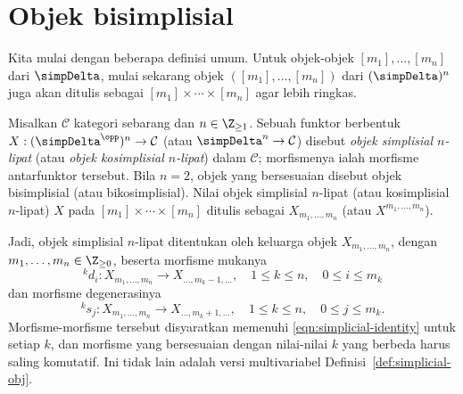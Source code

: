 
\section{Objek bisimplisial}\label{sec:bisimplicial}
\hypertarget{o014.aljabr2.chapter8.bisimplicial-a}{ }
Kita mulai dengan beberapa definisi umum. Untuk objek-objek
$[m_1],\ldots,[m_n]$ dari $\simpDelta$, mulai sekarang objek
$([m_1],\ldots,[m_n])$ dari $(\simpDelta)^n$ juga akan ditulis sebagai
$[m_1]\times\cdots\times[m_n]$ agar lebih ringkas.

\begin{definition}
	Misalkan $\mathcal{C}$ kategori sebarang dan $n\in\Z_{\geq1}$. Sebuah
	funktor berbentuk $X:(\simpDelta^{\opp})^n\to\mathcal{C}$ (atau
	$\simpDelta^n\to\mathcal{C}$) disebut \emph{objek simplisial $n$-lipat}
	(atau \emph{objek kosimplisial $n$-lipat}) dalam $\mathcal{C}$;
	morfismenya ialah morfisme antarfunktor tersebut. Bila $n=2$,
	objek yang bersesuaian disebut objek bisimplisial (atau bikosimplisial).
	Nilai objek simplisial $n$-lipat (atau kosimplisial $n$-lipat) $X$ pada
	$[m_1]\times\cdots\times[m_n]$ ditulis sebagai
	$X_{m_1,\ldots,m_n}$ (atau $X^{m_1,\ldots,m_n}$).
\end{definition}

Jadi, objek simplisial $n$-lipat ditentukan oleh keluarga objek
$X_{m_1,\ldots,m_n}$, dengan
$m_1,\ldots,m_n\in\Z_{\geq0}$, beserta morfisme mukanya
\[ {}^k d_i: X_{m_1, \ldots, m_n} \to X_{\ldots, m_k - 1, \ldots}, \quad 1 \leq k \leq n, \quad 0 \leq i \leq m_k \]
dan morfisme degenerasinya
\[ {}^k s_j: X_{m_1, \ldots, m_n} \to X_{\ldots, m_k + 1, \ldots}, \quad 1 \leq k \leq n, \quad 0 \leq j \leq m_k . \]
Morfisme-morfisme tersebut disyaratkan memenuhi
\eqref{eqn:simplicial-identity} untuk setiap $k$, dan morfisme yang
bersesuaian dengan nilai-nilai $k$ yang berbeda harus saling komutatif.
Ini tidak lain adalah versi multivariabel
Definisi~\ref{def:simplicial-obj}.

